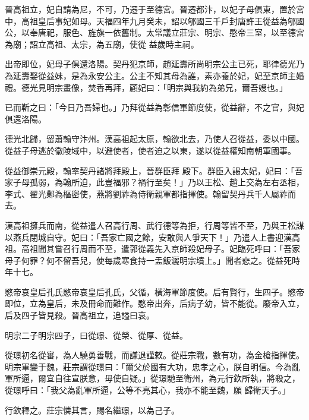 \begin{pinyinscope}
 晉高祖立，妃自請為尼，不可，乃遷于至德宮。晉遷都汴，以妃子母俱東，置於宮中，高祖皇后事妃如母。天福四年九月癸未，詔以郇國三千戶封唐許王從益為郇國公，以奉唐祀，服色、旌旗一依舊制。太常議立莊宗、明宗、愍帝三室，以至德宮為廟；詔立高祖、太宗，為五廟，使從
 益歲時主祠。



 出帝即位，妃母子俱還洛陽。契丹犯京師，趙延壽所尚明宗公主已死，耶律德光乃為延壽娶從益妹，是為永安公主。公主不知其母為誰，素亦養於妃，妃至京師主婚禮。德光見明宗畫像，焚香再拜，顧妃曰：「明宗與我約為弟兄，爾吾嫂也。」



 已而靳之曰：「今日乃吾婦也。」乃拜從益為彰信軍節度使，從益辭，不之官，與妃俱還洛陽。



 德光北歸，留蕭翰守汴州。漢高祖起太原，翰欲北去，乃使人召從益，委以中國。從益子母逃於徽陵域中，以避使者，使者迫之以東，遂以從益權知南朝軍國事。



 從益御崇元殿，翰率契丹諸將拜殿上，晉群臣拜
 殿下。群臣入謁太妃，妃曰：「吾家子母孤弱，為翰所迫，此豈福邪？禍行至矣！」乃以王松、趙上交為左右丞相，李式、翟光鄴為樞密使，燕將劉祚為侍衛親軍都指揮使。翰留契丹兵千人屬祚而去。



 漢高祖擁兵而南，從益遣人召高行周、武行德等為拒，行周等皆不至，乃與王松謀以燕兵閉城自守。妃曰：「吾家亡國之餘，安敢與人爭天下！」乃遣人上書迎漢高祖。高祖聞其嘗召行周而不至，遣郭從義先入京師殺妃母子。妃臨死呼曰：「吾家母子何罪？何不留吾兒，使每歲寒食持一盂飯灑明宗墳上。」聞者悲之。從益死時年十七。



 愍帝哀皇后孔氏愍帝哀皇后孔氏，父循，橫海軍節度使。后有賢行，生四子。愍帝即位，立為皇后，未及冊命而難作。愍帝出奔，后病子幼，皆不能從。廢帝入立，后及四子皆見殺。晉高祖立，追謚曰哀。



 明宗二子明宗四子，曰從璟、從榮、從厚、從益。



 從璟初名從審，為人驍勇善戰，而謙退謹敕。從莊宗戰，數有功，為金槍指揮使。明宗軍變于魏，莊宗謂從璟曰：「爾父於國有大功，忠孝之心，朕自明信。今為亂軍所逼，爾宜自往宣朕意，毋使自疑。」從璟馳至衛州，為元行欽所執，將殺之，從璟呼曰：「我父為亂軍所逼，公等不亮其心，我亦不能至魏，願
 歸衛天子。」



 行欽釋之。莊宗憐其言，賜名繼璟，以為己子。




\end{pinyinscope}

